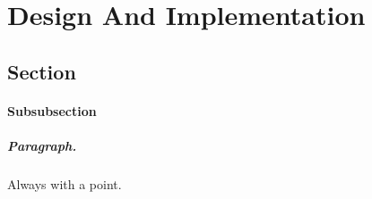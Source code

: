 \chapter{Design And Implementation}
\label{chap:design}
\section{Section}
%
\subsubsection{Subsubsection}

\paragraph{Paragraph.} Always with a point.


